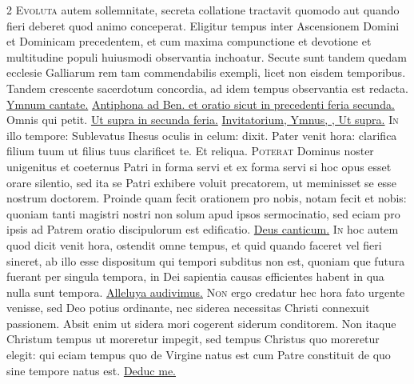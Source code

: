 \begin{multicols*}{2}
\lettrine[lines=2]{\zallmancaps \color{Red} E}{voluta} autem sollemnitate, secreta collatione tractavit quomodo aut quando fieri deberet quod animo conceperat. Eligitur tempus inter Ascensionem Domini et Dominicam precedentem, et cum maxima compunctione et devotione et multitudine populi huiusmodi observantia inchoatur. Secute sunt tandem quedam ecclesie Galliarum rem tam commendabilis exempli, licet non eisdem temporibus. Tandem crescente sacerdotum concordia, ad idem tempus observantia est redacta. \R \hyperlink{ymnum-cantate}{Ymnum cantate.}
\newline \ul{Antiphona ad Ben. et oratio sicut in precedenti feria secunda.}
 Omnis qui petit. \ul{Ut supra in secunda feria.}
{\color{Red} }
 \ul{Invitatorium, Ymnus, \Vbar , Ut supra.}
\lettrine[lines=2]{\zallmancaps \color{Blue} I}{n} illo tempore: Sublevatus Ihesus oculis in celum: dixit. Pater venit hora: clarifica filium tuum ut filius tuus clarificet te. Et reliqua.
\lettrine[lines=2]{\zallmancaps \color{Red} P}{oterat} Dominus noster unigenitus et coeternus Patri in forma servi et ex forma servi si hoc opus esset orare silentio, sed ita se Patri exhibere voluit precatorem, ut meminisset se esse nostrum doctorem. Proinde quam fecit orationem pro nobis, notam fecit et nobis: quoniam tanti magistri nostri non solum apud ipsos sermocinatio, sed eciam pro ipsis ad Patrem oratio discipulorum est edificatio. \R \hyperlink{deus-canticum}{Deus canticum.}
\lettrine[lines=2]{\zallmancaps \color{Blue} I}{n} hoc autem quod dicit venit hora, ostendit omne tempus, et quid quando faceret vel fieri sineret, ab illo esse dispositum qui tempori subditus non est, quoniam que futura fuerant per singula tempora, in Dei sapientia causas efficientes habent in qua nulla sunt tempora. \R \hyperlink{alleluya-audivimus}{Alleluya audivimus.}
\lettrine[lines=2]{\zallmancaps \color{Red} N}{on} ergo credatur hec hora fato urgente venisse, sed Deo potius ordinante, nec siderea necessitas Christi connexuit passionem. Absit enim ut sidera mori cogerent siderum conditorem. Non itaque Christum tempus ut moreretur impegit, sed tempus Christus quo moreretur elegit: qui eciam tempus quo de Virgine natus est cum Patre constituit de quo sine tempore natus est. \R \hyperlink{deduc-me}{Deduc me.}

\end{multicols*}
